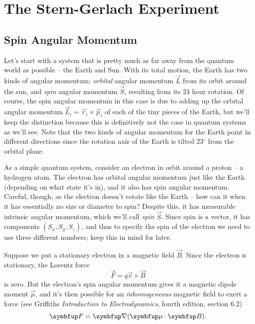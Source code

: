 \chapter{The Stern-Gerlach Experiment}

\section{Spin Angular Momentum}

Let's start with a system that is pretty much as far away from the quantum world as possible -- the Earth and Sun.  With its total motion, the Earth has two kinds of angular momentum:  \emph{orbital} angular momentum $\vec{L}$ from its orbit around the sun, and \emph{spin} angular momentum $\vec{S}$, resulting from its 24 hour rotation.  Of course, the spin angular momentum in this case is due to adding up the orbital angular momentum $\vec{L}_i = \vec{r}_i \times \vec{p}_i$ of each of the tiny pieces of the Earth, but we'll keep the distinction because this is definitively not the case in quantum systems as we'll see.  Note that the two kinds of angular momentum for the Earth point in different directions since the rotation axis of the Earth is tilted 23$^\circ$ from the orbital plane.

As a simple quantum system, consider an electron in orbit around a proton -- a hydrogen atom.  The electron has orbital angular momentum just like the Earth (depending on what state it's in), and it also has spin angular momentum.  Careful, though, as the electron doesn't rotate like the Earth -- how can it when it has essentially no size or diameter to spin?  Despite this, it has measurable intrinsic angular momentum, which we'll call \emph{spin} $\vec{S}$.  Since spin is a vector, it has components $(S_x, S_y, S_z)$, and thus to specify the spin of the electron we need to use three different numbers; keep this in mind for later.

Suppose we put a stationary electron in a magnetic field $\vec{B}$.  Since the electron is stationary, the Lorentz force
\[
\vec{F} = q\vec{v} \times \vec{B}
\]
is zero.  But the electron's spin angular momentum gives it a magnetic dipole moment $\vec{\mu}$, and it's then possible for an \emph{inhomogeneous} magnetic field to exert a force (see Griffiths \emph{Introduction to Electrodynamics}, fourth edition, section 6.2)
\begin{equation}
\vec{F} = \grad (\vec{\mu} \cdot \vec{B}).
\label{eq_force_inhomo}
\end{equation}

